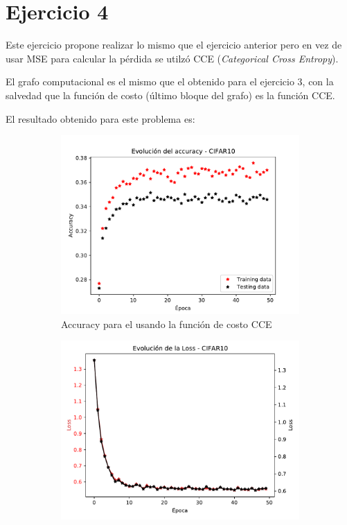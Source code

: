 \section{Ejercicio 4}

Este ejercicio propone realizar lo mismo que el ejercicio anterior pero en vez de usar MSE para calcular la pérdida se utilzó CCE (\textit{Categorical Cross Entropy}).

El grafo computacional es el mismo que el obtenido para el ejercicio 3, con la salvedad que la función de costo (último bloque del grafo) es la función CCE.

El resultado obtenido para este problema es:

\begin{figure}[H]
     \centering
     \begin{subfigure}[b]{0.45\textwidth}
         \centering
         \includegraphics[width=\textwidth]{image/EJ4_Acc.pdf}
         \caption{Accuracy para el usando la función de costo CCE}
         \label{fig:acc6a}
     \end{subfigure}
     \hfill
     \begin{subfigure}[b]{0.45\textwidth}
         \centering
         \includegraphics[width=\textwidth]{image/EJ4_Loss.pdf}

\end{subfigure}
\end{figure}

